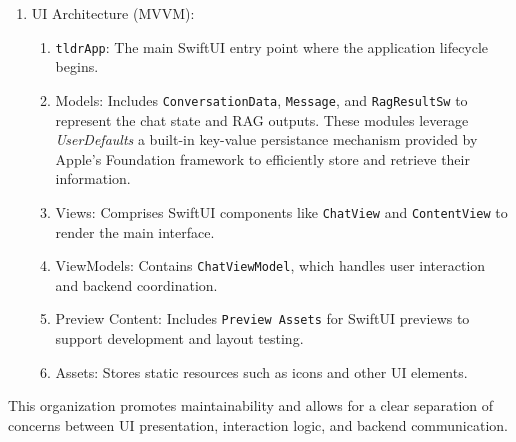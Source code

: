 \begin{enumerate}[label=\Alph*.]
    \itemOverall Structure:
    \begin{enumerate}[label=\alph*.]
        \item \texttt{tldr}: The Swift language codebase that creates the user interface.
        \item \texttt{TldrAPI}: C++ module with bindings for Swift UI. It serves as a bridge between the Swift UI and the C++ static library of the RAG Backend.
    \item \texttt{artefacts}: Quantized LLM weights and coreml packages, i.e:
    \begin{itemize}
        \item \texttt{Llama-3.2-1B-Instruct-Q3\_K\_L} model for chat
        \item \texttt{all-MiniLM-L6-v2-Q8\_0} model for generating embeddings
        \item \texttt{CosineSimilarityBatched} coreml package for cosine similarity on NPU
    \end{itemize}
    \end{enumerate}

    \item UI Architecture (MVVM):
    \begin{enumerate}[label=\alph*.]
        \item \texttt{tldrApp}: The main SwiftUI entry point where the application lifecycle begins.
        \item Models: Includes \texttt{ConversationData}, \texttt{Message}, and \texttt{RagResultSw} to represent the chat state and RAG outputs. These modules leverage \textit{UserDefaults} a built-in key-value persistance mechanism provided by Apple's Foundation framework to efficiently store and retrieve their information.
        \item Views: Comprises SwiftUI components like \texttt{ChatView} and \texttt{ContentView} to render the main interface.
        \item ViewModels: Contains \texttt{ChatViewModel}, which handles user interaction and backend coordination.
        \item Preview Content: Includes \texttt{Preview Assets} for SwiftUI previews to support development and layout testing.
        \item Assets: Stores static resources such as icons and other UI elements.
    \end{enumerate}
\end{enumerate}
This organization promotes maintainability and allows for a clear separation of concerns between UI presentation, interaction logic, and backend communication.
